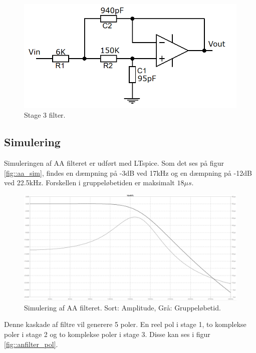 \begin{figure}[h!]
	\centering
	\includegraphics[scale=0.4]{./billeder/stage3}
	\caption{Stage 3 filter.}
	\label{fig::filter_stage3}
\end{figure}
\FloatBlock

\subsection{Simulering}
Simuleringen af AA filteret er udført med LTspice. Som det ses på figur \ref{fig::aa_sim}, findes en dæmpning på -3dB ved 17kHz og en dæmpning på -12dB ved 22.5kHz. Forskellen i gruppeløbetiden er maksimalt $18 \mu s$.
\begin{figure}[h!]
	\centering
	\includegraphics[scale=0.2]{./billeder/aa_sim1}
	\caption{Simulering af AA filteret. Sort: Amplitude, Grå: Gruppeløbetid.}
	\label{fig::afilter_aasim}
\end{figure}
\FloatBlock
Denne kaskade af filtre vil generere 5 poler. En reel pol i stage 1, to komplekse poler i stage 2 og to komplekse poler i stage 3. Disse kan ses i figur \ref{fig::anfilter_pol}.

